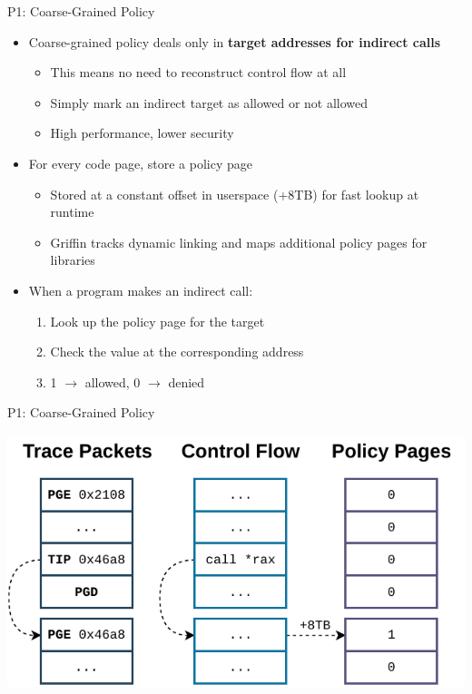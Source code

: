 \documentclass[12pt, dvipsnames, aspectratio=169]{beamer}
\begin{document}
\begin{frame}[c]{P1: Coarse-Grained Policy}{}
  \begin{itemize}
    \item Coarse-grained policy deals only in {\bf target addresses for indirect calls}
    \begin{itemize}
      \item This means no need to reconstruct control flow at all
      \item Simply mark an indirect target as allowed or not allowed
      \item High performance, lower security
    \end{itemize}

    \vfill
    \item For every code page, store a policy page
    \begin{itemize}
      \item Stored at a constant offset in userspace (+8TB) for fast lookup at runtime
      \item Griffin tracks dynamic linking and maps additional policy pages for libraries
    \end{itemize}

    \vfill
    \item When a program makes an indirect call:
    \begin{enumerate}
      \item Look up the policy page for the target
      \item Check the value at the corresponding address
      \item 1 $\rightarrow$ allowed, 0 $\rightarrow$ denied
    \end{enumerate}
  \end{itemize}
\end{frame}

\begin{frame}[c]{P1: Coarse-Grained Policy}{}
  \begin{center}
    \color{black}
    \includegraphics[width=0.8\columnwidth]{figs/indirect_call.pdf}
  \end{center}
\end{frame}
\end{document}
